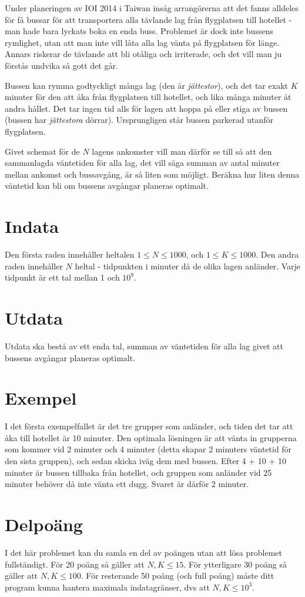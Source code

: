 
Under planeringen av IOI 2014 i Taiwan insåg arrangörerna att det fanns alldeles för få bussar för att transportera alla tävlande lag från flygplatsen till hotellet - man hade bara lyckats boka en enda buss. Problemet är dock inte bussens rymlighet, utan att man inte vill låta alla lag vänta på flygplatsen för länge. Annars riskerar de tävlande att bli otåliga och irriterade, och det vill man ju förstås undvika så gott det går.

Bussen kan rymma godtyckligt många lag (den är \emph{jättestor}), och det tar exakt $K$ minuter för den att åka från flygplatsen till hotellet, och lika många minuter åt andra hållet. Det tar ingen tid alls för lagen att hoppa på eller stiga av bussen (bussen har \emph{jättestora} dörrar). Ursprungligen står bussen parkerad utanför flygplatsen.

Givet schemat för de $N$ lagens ankomster vill man därför se till så att den sammanlagda väntetiden för alla lag, det vill säga summan av antal minuter mellan ankomst och bussavgång, är så liten som möjligt. Beräkna hur liten denna väntetid kan bli om bussens avgångar planeras optimalt.

\section*{Indata}
Den första raden innehåller heltalen $1 \leq N \leq 1 000$, och $1 \leq K \leq 1000$.
Den andra raden innehåller $N$ heltal - tidpunkten i minuter då de olika lagen anländer. Varje tidpunkt är ett tal mellan 1 och $10^9$.

\section*{Utdata}
Utdata ska bestå av ett enda tal, summan av väntetiden för alla lag givet att bussens avgångar planeras optimalt.

\section*{Exempel}
I det första exempelfallet är det tre grupper som anländer, och tiden det tar att åka till hotellet är 10 minuter. Den optimala lösningen är att vänta in grupperna som kommer vid 2 minuter och 4 minuter (detta skapar 2 minuters väntetid för den sista gruppen), och sedan skicka iväg dem med bussen. Efter 4 + 10 + 10 minuter är bussen tillbaka från hotellet, och gruppen som anländer vid 25 minuter behöver då inte vänta ett dugg. Svaret är därför 2 minuter.

\section*{Delpoäng}
I det här problemet kan du samla en del av poängen utan att lösa problemet fullständigt. För 20 poäng så gäller att $N, K \leq 15$. För ytterligare 30 poäng så gäller att $N,K \leq 100$. För resterande 50 poäng (och full poäng) måste ditt program kunna hantera maximala indatagränser, dvs att $N, K \leq 10^3$.
